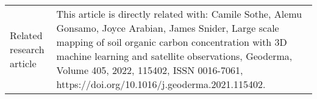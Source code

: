 \documentclass[times,final]{elsarticle.cls}
\begin{document}
{\begin{longtable}{|p{33mm}|p{94mm}|}

\hline                         
Related                 
research\newline
article                &  This article is directly related with:\newline\newline
                            Camile Sothe, Alemu Gonsamo, Joyce Arabian, James Snider, Large scale mapping of soil organic carbon concentration with 3D machine learning and satellite observations, Geoderma, Volume 405, 2022, 115402, ISSN 0016-7061, https://doi.org/10.1016/j.geoderma.2021.115402.







\end{longtable}
}
\end{document}
